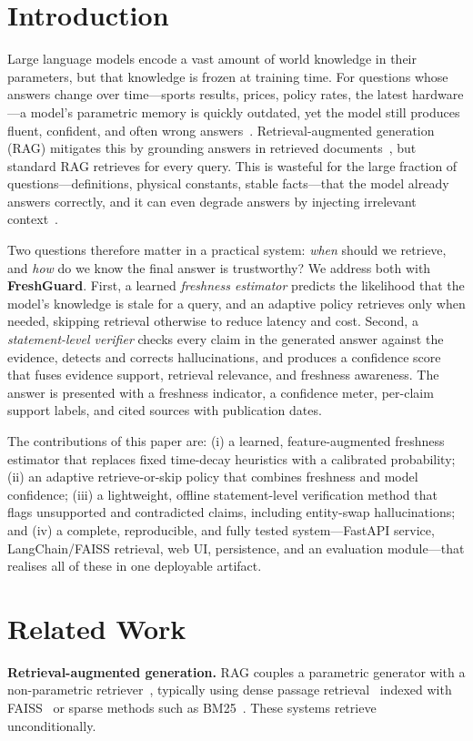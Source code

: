 \documentclass[conference]{IEEEtran}
\begin{document}
\section{Introduction}
Large language models encode a vast amount of world knowledge in their parameters,
but that knowledge is frozen at training time. For questions whose answers change
over time---sports results, prices, policy rates, the latest hardware---a model's
parametric memory is quickly outdated, yet the model still produces fluent,
confident, and often wrong answers~\cite{kasai2023realtimeqa,vu2023freshllms}.
Retrieval-augmented generation (RAG) mitigates this by grounding answers in retrieved
documents~\cite{lewis2020rag}, but standard RAG retrieves for every query. This is
wasteful for the large fraction of questions---definitions, physical constants,
stable facts---that the model already answers correctly, and it can even degrade
answers by injecting irrelevant context~\cite{mallen2023popqa}.

Two questions therefore matter in a practical system: \emph{when} should we retrieve,
and \emph{how} do we know the final answer is trustworthy? We address both with
\textbf{FreshGuard}. First, a learned \emph{freshness estimator} predicts the
likelihood that the model's knowledge is stale for a query, and an adaptive policy
retrieves only when needed, skipping retrieval otherwise to reduce latency and cost.
Second, a \emph{statement-level verifier} checks every claim in the generated answer
against the evidence, detects and corrects hallucinations, and produces a confidence
score that fuses evidence support, retrieval relevance, and freshness awareness. The
answer is presented with a freshness indicator, a confidence meter, per-claim support
labels, and cited sources with publication dates.

The contributions of this paper are: (i) a learned, feature-augmented freshness
estimator that replaces fixed time-decay heuristics with a calibrated probability;
(ii) an adaptive retrieve-or-skip policy that combines freshness and model confidence;
(iii) a lightweight, offline statement-level verification method that flags
unsupported and contradicted claims, including entity-swap hallucinations; and
(iv) a complete, reproducible, and fully tested system---FastAPI service, LangChain/FAISS
retrieval, web UI, persistence, and an evaluation module---that realises all of these
in one deployable artifact.

\section{Related Work}
\textbf{Retrieval-augmented generation.} RAG couples a parametric generator with a
non-parametric retriever~\cite{lewis2020rag}, typically using dense passage
retrieval~\cite{karpukhin2020dpr} indexed with FAISS~\cite{johnson2019faiss} or sparse
methods such as BM25~\cite{robertson2009bm25}. These systems retrieve unconditionally.
\end{document}
